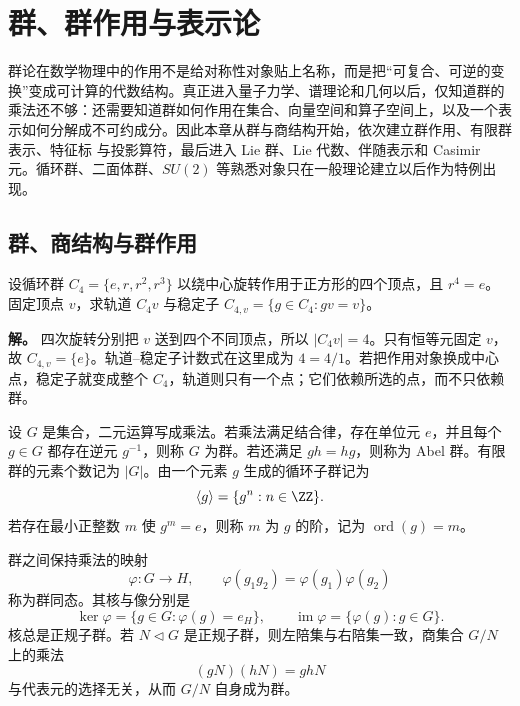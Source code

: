 \chapter{群、群作用与表示论} \label{chap:math-structures}
\label{chap:group-theory}

群论在数学物理中的作用不是给对称性对象贴上名称，而是把“可复合、可逆的变换”变成可计算的代数结构。真正进入量子力学、谱理论和几何以后，仅知道群的乘法还不够：还需要知道群如何作用在集合、向量空间和算子空间上，以及一个表示如何分解成不可约成分。因此本章从群与商结构开始，依次建立群作用、有限群表示、特征标 与投影算符，最后进入 Lie 群、Lie 代数、伴随表示和 Casimir 元。循环群、二面体群、$SU(2)$ 等熟悉对象只在一般理论建立以后作为特例出现。



\section{群、商结构与群作用}

\begin{workedexample}[正方形顶点的轨道与稳定子]
设循环群 \(C_4=\{e,r,r^2,r^3\}\) 以绕中心旋转作用于正方形的四个顶点，且 \(r^4=e\)。固定顶点 \(v\)，求轨道 \(C_4v\) 与稳定子 \(C_{4,v}=\{g\in C_4:gv=v\}\)。

\textbf{解。} 四次旋转分别把 \(v\) 送到四个不同顶点，所以 \(|C_4v|=4\)。只有恒等元固定 \(v\)，故 \(C_{4,v}=\{e\}\)。轨道--稳定子计数式在这里成为 \(4=4/1\)。若把作用对象换成中心点，稳定子就变成整个 \(C_4\)，轨道则只有一个点；它们依赖所选的点，而不只依赖群。
\end{workedexample}

\label{sec:group-basics}
\begin{definition}[群、循环子群与元素的阶]
设 $G$ 是集合，二元运算写成乘法。若乘法满足结合律，存在单位元 $e$，并且每个 $g\in G$ 都存在逆元 $g^{-1}$，则称 $G$ 为群。若还满足 $gh=hg$，则称为 Abel 群。有限群的元素个数记为 $|G|$。由一个元素 $g$ 生成的循环子群记为
\[
\langle g\rangle=\{g^n:n\in\ZZ\}.
\]
若存在最小正整数 $m$ 使 $g^m=e$，则称 $m$ 为 $g$ 的阶，记为 $\operatorname{ord}(g)=m$。
\end{definition}

\begin{definition}
群之间保持乘法的映射
\[
\varphi:G\longrightarrow H,
\qquad
\varphi(g_1g_2)=\varphi(g_1)\varphi(g_2)
\]
称为群同态。其核与像分别是
\[
\ker\varphi=\{g\in G:\varphi(g)=e_H\},
\qquad
\operatorname{im}\varphi=\{\varphi(g):g\in G\}.
\]
核总是正规子群。若 $N\triangleleft G$ 是正规子群，则左陪集与右陪集一致，商集合 $G/N$ 上的乘法
\[
(gN)(hN)=ghN
\]
与代表元的选择无关，从而 $G/N$ 自身成为群。
\end{definition}

